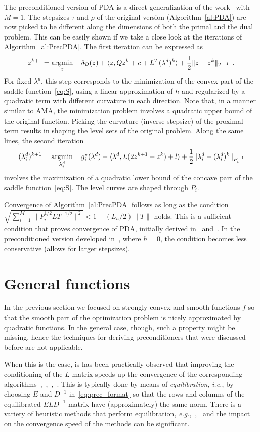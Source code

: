 \documentclass[openany]{now}
\newcommand{\eg}{{\it e.g.}}
\newcommand{\ie}{{\it i.e.}}
\newcommand{\argmin}{\mathop{\rm argmin}}
\begin{document}
The preconditioned version of PDA is a direct generalization of the work~\cite{pock2011diagonal} with $M=1$. The stepsizes $\tau$ and $\rho$ of the original version (Algorithm~\ref{al:PDA}) are now picked to be different along the dimensions of both the primal and the dual problem. This can be easily shown if we take a close look at the iterations of Algorithm~\ref{al:PrecPDA}. The first iteration can be expressed as
\[
 z^{k+1} = \argmin\limits_z\quad \delta_\mathcal{D}(z) + \langle z, Qz^k+c+L^T(\lambda^d)^k\rangle + \frac{1}{2}\|z-z^k\|_{T^{-1}}\enspace.
\]
For fixed $\lambda^d$, this step corresponds to the minimization of the convex part of the saddle function~\eqref{eq:S}, using a linear approximation of $h$ and regularized by a quadratic term with different curvature in each direction. Note that, in a manner similar to AMA, the minimization problem involves a quadratic upper bound of the original function. Picking the curvature (inverse stepsize) of the proximal term results in shaping the level sets of the original problem. Along the same lines, the second iteration 
\[
 (\lambda_i^d)^{k+1} = \argmin\limits_{\lambda_i^d} \quad g_i^\star(\lambda^d) - \langle\lambda^d, L(2z^{k+1}-z^k)+l \rangle + \frac{1}{2}\|\lambda_i^d-(\lambda_i^d)^k\|_{P_i^{-1}}
\] 
involves the maximization of a quadratic lower bound of the concave part of the saddle function~\eqref{eq:S}. The level curves are shaped through $P_i$.

Convergence of Algorithm~\ref{al:PrecPDA} follows as long as the condition $\sqrt{\sum_{i=1}^M\|P_i^{1/2}LT^{-1/2}\|^2} < 1-(L_h/2)\|T\|$ holds. This is a sufficient condition that proves convergence of PDA, initially derived in~\cite{pda_vu} and~\cite{condat2011primal}. In the preconditioned version developed in~\cite{pock2011diagonal}, where $h=0$, the condition becomes less conservative (allows for larger stepsizes). 


\section{General functions}
In the previous section we focused on strongly convex and smooth functions $f$ so that the smooth part of the optimization problem is nicely approximated by quadratic functions. In the general case, though, such a property might be missing, hence the techniques for deriving preconditioners that were discussed before are not applicable. 

When this is the case, is has been practically observed that improving the conditioning of the $L$ matrix speeds up the convergence of the corresponding algorithms~\cite{PDOS},~\cite{pogs},~\cite{Giselsson:fbds},~\cite{pock2011diagonal}. This is typically done by means of \emph{equilibration}, \ie, by choosing $E$ and $D^{-1}$ in~\eqref{eq:prec_format} so that the rows and columns of the equilibrated $ELD^{-1}$ matrix have (approximately) the same norm. There is a variety of heuristic methods that perform equilibration, \eg,~\cite{sinkhorn1967},~\cite{Equilibration1} and the impact on the convergence speed of the methods can be significant.
\end{document}
